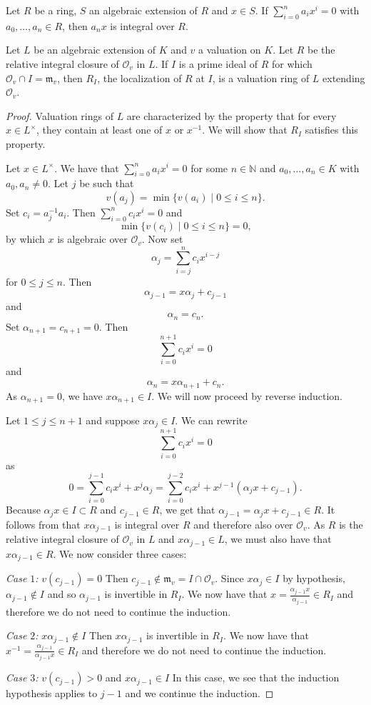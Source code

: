 \documentclass[10pt,a4paper]{amsart}
\begin{document}
\begin{lem}{\label{ax}}
Let $R$ be a ring, $S$ an algebraic extension of $R$ and \hbox{$x\in S$.}
If $\sum_{i=0}^na_ix^i=0$ with $a_0,\ldots,a_n\in R$, then $a_nx$ is integral over $R$.
\end{lem}

\begin{prop}{\label{loc}}
Let $L$ be an algebraic extension of $K$ and $v$ a valuation on $K$.
Let $R$ be the relative integral closure of $\mathcal{O}_v$ in $L$.
If $I$ is a prime ideal of $R$ for which $\mathcal{O}_v\cap I=\mathfrak{m}_v$,
then $R_I$, the localization of $R$ at $I$, is a valuation ring of $L$ extending $\mathcal{O}_v$.
\end{prop}

\begin{proof}
Valuation rings of $L$ are characterized by the property that for every $x\in L^{\times}$, they contain at least one of $x$ or $x^{-1}$.
We will show that $R_I$ satisfies this property.

Let $x\in L^{\times}$.
We have that $\sum_{i=0}^na_ix^i=0$ for some $n\in\mathds{N}$ and $a_0,\ldots,a_n\in K$ with $a_0,a_n\neq0$.
Let $j$ be such that $$v(a_j)=\min\{v(a_i)\mid0\leq i\leq n\}.$$ Set $c_i=a_j^{-1}a_i$.
Then $\sum_{i=0}^nc_ix^i=0$ and $$\min\{v(c_i)\mid0\leq i\leq n\}=0,$$ by which $x$ is algebraic over $\mathcal{O}_v$.
Now set $$\alpha_j=\sum_{i=j}^{n}c_ix^{i-j}$$
for $0\leq j\leq n$. Then $$\alpha_{j-1}=x\alpha_j+c_{j-1}$$ and $$\alpha_{n}=c_{n}.$$
Set $\alpha_{n+1}=c_{n+1}=0$. Then $$\sum_{i=0}^{n+1}c_ix^i=0$$ and $$\alpha_{n}=x\alpha_{n+1}+c_{n}.$$
As $\alpha_{n+1}=0$, we have $x\alpha_{n+1}\in I$.
We will now proceed by reverse induction.

Let $1\leq j\leq n+1$ and suppose $x\alpha_j\in I$.
We can rewrite $$\sum_{i=0}^{n+1}c_ix^i=0$$
as
$$0=\sum_{i=0}^{j-1}c_ix^i+x^j\alpha_j=\sum_{i=0}^{j-2}c_ix^i+x^{j-1}(\alpha_jx+c_{j-1}).$$
Because $\alpha_jx\in I\subset R$ and $c_{j-1}\in R$, we get that $\alpha_{j-1}=\alpha_jx+c_{j-1}\in R$.
It follows from  that $x\alpha_{j-1}$ is integral over $R$ and therefore also over $\mathcal{O}_v$.
As $R$ is the relative integral closure of $\mathcal{O}_v$ in $L$ and $x\alpha_{j-1}\in L$, we must also have that $x\alpha_{j-1}\in R$.
We now consider three cases:\par
\textit{Case $1$:} $v(c_{j-1})=0$\newline
Then $c_{j-1}\notin \mathfrak{m}_v=I\cap \mathcal{O}_v$.
Since $x\alpha_j\in I$ by hypothesis, $\alpha_{j-1}\notin I$ and so $\alpha_{j-1}$ is invertible in $R_I$.
We now have that $x=\frac{\alpha_{j-1}x}{\alpha_{j-1}}\in R_I$ and therefore we do not need to continue the induction.\par
\textit{Case $2$:} $x\alpha_{j-1}\notin I$\newline
Then $x\alpha_{j-1}$ is invertible in $R_I$.
We now have that $x^{-1}=\frac{\alpha_{j-1}}{\alpha_{j-1}x}\in R_I$ and therefore we do not need to continue the induction.\par
\textit{Case $3$:} $v(c_{j-1})>0$ and $x\alpha_{j-1}\in I$\newline
In this case, we see that the induction hypothesis applies to $j-1$ and we continue the induction.


\end{proof}
\end{document}
